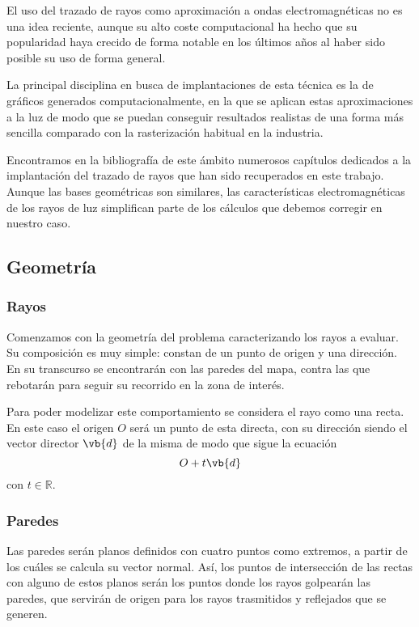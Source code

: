 El uso del trazado de rayos como aproximación a ondas electromagnéticas no es una idea reciente, aunque su alto coste computacional ha hecho que su popularidad haya crecido de forma notable en los últimos años al haber sido posible su uso de forma general.

La principal disciplina en busca de implantaciones de esta técnica es la de gráficos generados computacionalmente, en la que se aplican estas aproximaciones a la luz de modo que se puedan conseguir resultados realistas de una forma más sencilla comparado con la rasterización habitual en la industria.

Encontramos en la bibliografía de este ámbito numerosos capítulos dedicados a la implantación del trazado de rayos que han sido recuperados en este trabajo.
Aunque las bases geométricas son similares, las características electromagnéticas de los rayos de luz simplifican parte de los cálculos que debemos corregir en nuestro caso.

\subsection{Geometría}

\subsubsection{Rayos}
Comenzamos con la geometría del problema caracterizando los rayos a evaluar.
Su composición es muy simple: constan de un punto de origen y una dirección.
En su transcurso se encontrarán con las paredes del mapa, contra las que rebotarán para seguir su recorrido en la zona de interés.

Para poder modelizar este comportamiento se considera el rayo como una recta.
En este caso el origen $O$ será un punto de esta directa, con su dirección siendo el vector director $\vb{d}$ de la misma de modo que sigue la ecuación
\begin{equation}
    O + t\vb{d}
\end{equation}
con $t\in \mathbb{R}$.

\subsubsection{Paredes}
Las paredes serán planos definidos con cuatro puntos como extremos, a partir de los cuáles se calcula su vector normal.
Así, los puntos de intersección de las rectas con alguno de estos planos serán los puntos donde los rayos golpearán las paredes, que servirán de origen para los rayos trasmitidos y reflejados que se generen.

